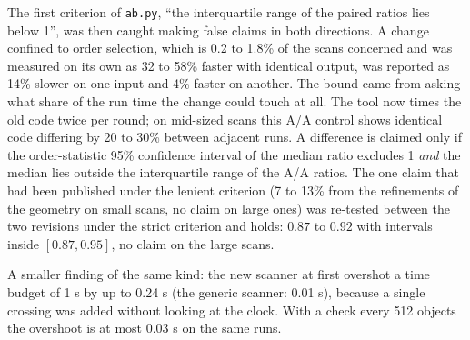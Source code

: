 The first criterion of \texttt{ab.py}, ``the interquartile range of the paired
ratios lies below 1'', was then caught making false claims in both directions.
A change confined to order selection, which is 0.2 to 1.8\% of the scans
concerned and was measured on its own as 32 to 58\% faster with identical
output, was reported as 14\% slower on one input and 4\% faster on another.
The bound came from asking what share of the run time the change could touch
at all. The tool now times the old code twice per round; on mid-sized scans
this A/A control shows identical code differing by 20 to 30\% between adjacent
runs. A difference is claimed only if the order-statistic 95\% confidence
interval of the median ratio excludes 1 \emph{and} the median lies outside the
interquartile range of the A/A ratios. The one claim that had been published
under the lenient criterion (7 to 13\% from the refinements of the geometry on
small scans, no claim on large ones) was re-tested between the two revisions
under the strict criterion and holds: $0.87$ to $0.92$ with intervals inside
$[0.87, 0.95]$, no claim on the large scans.

A smaller finding of the same kind: the new scanner at first overshot a time
budget of 1 s by up to 0.24 s (the generic scanner: 0.01 s), because a single
crossing was added without looking at the clock. With a check every 512
objects the overshoot is at most 0.03 s on the same runs.
